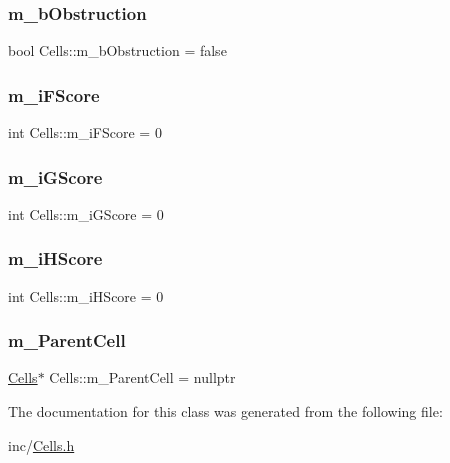 \subsubsection{\texorpdfstring{m\+\_\+b\+Obstruction}{m\_bObstruction}}
{\footnotesize\ttfamily bool Cells\+::m\+\_\+b\+Obstruction = false}

\mbox{\label{class_cells_a4c0eadc267ff60babcabe97347d9e452}} 
\subsubsection{\texorpdfstring{m\+\_\+i\+F\+Score}{m\_iFScore}}
{\footnotesize\ttfamily int Cells\+::m\+\_\+i\+F\+Score = 0}

\mbox{\label{class_cells_abe9c29d1ede13bf4fe3980ab837e81ce}} 
\subsubsection{\texorpdfstring{m\+\_\+i\+G\+Score}{m\_iGScore}}
{\footnotesize\ttfamily int Cells\+::m\+\_\+i\+G\+Score = 0}

\mbox{\label{class_cells_a00f6a71c14e40130259bbdeb15394f67}} 
\subsubsection{\texorpdfstring{m\+\_\+i\+H\+Score}{m\_iHScore}}
{\footnotesize\ttfamily int Cells\+::m\+\_\+i\+H\+Score = 0}

\mbox{\label{class_cells_ae71aff17afdd01c99293906893c67354}} 
\subsubsection{\texorpdfstring{m\+\_\+\+Parent\+Cell}{m\_ParentCell}}
{\footnotesize\ttfamily \mbox{\hyperlink{class_cells}{Cells}}$\ast$ Cells\+::m\+\_\+\+Parent\+Cell = nullptr}



The documentation for this class was generated from the following file\+:\begin{DoxyCompactItemize}
\item 
inc/\mbox{\hyperlink{_cells_8h}{Cells.\+h}}\end{DoxyCompactItemize}
